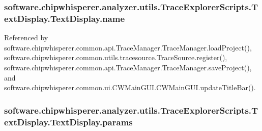 \subsubsection[{name}]{\setlength{\rightskip}{0pt plus 5cm}software.\+chipwhisperer.\+analyzer.\+utils.\+Trace\+Explorer\+Scripts.\+Text\+Display.\+Text\+Display.\+name}\label{classsoftware_1_1chipwhisperer_1_1analyzer_1_1utils_1_1TraceExplorerScripts_1_1TextDisplay_1_1TextDisplay_a24bcea32336c8d061e98c8a3cc290fd8}


Referenced by software.\+chipwhisperer.\+common.\+api.\+Trace\+Manager.\+Trace\+Manager.\+load\+Project(), software.\+chipwhisperer.\+common.\+utils.\+tracesource.\+Trace\+Source.\+register(), software.\+chipwhisperer.\+common.\+api.\+Trace\+Manager.\+Trace\+Manager.\+save\+Project(), and software.\+chipwhisperer.\+common.\+ui.\+C\+W\+Main\+G\+U\+I.\+C\+W\+Main\+G\+U\+I.\+update\+Title\+Bar().

\hypertarget{classsoftware_1_1chipwhisperer_1_1analyzer_1_1utils_1_1TraceExplorerScripts_1_1TextDisplay_1_1TextDisplay_aa746b6ba4210f05f336a2700dda77106}{}
\subsubsection[{params}]{\setlength{\rightskip}{0pt plus 5cm}software.\+chipwhisperer.\+analyzer.\+utils.\+Trace\+Explorer\+Scripts.\+Text\+Display.\+Text\+Display.\+params}\label{classsoftware_1_1chipwhisperer_1_1analyzer_1_1utils_1_1TraceExplorerScripts_1_1TextDisplay_1_1TextDisplay_aa746b6ba4210f05f336a2700dda77106}


